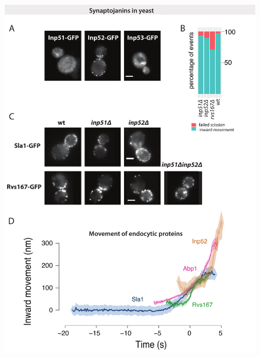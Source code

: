 		\begin{figure}
		\centering
		\includegraphics[width=22cm,height=22cm,keepaspectratio]{figures/results_final/inp}
		\end{figure}
		
